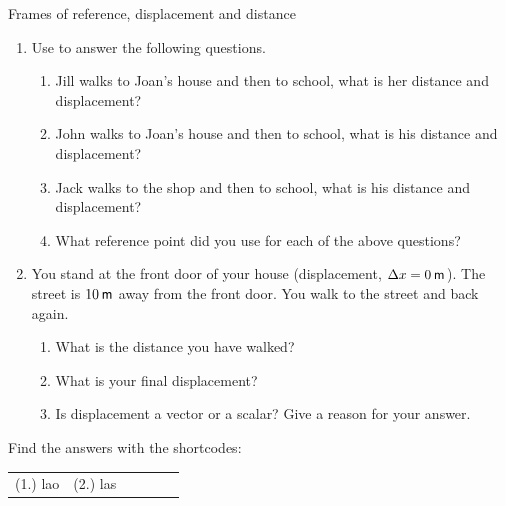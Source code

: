 \begin{exercises}{Frames of reference, displacement and distance}
            \nopagebreak
        \label{m38788*id64042}\begin{enumerate}[noitemsep, label=\textbf{\arabic*}. ] 
            \label{m38788*uid20}\item Use  to answer the following questions.
\label{m38788*id64060}\begin{enumerate}[noitemsep, label=\textbf{\alph*}. ] 
            \label{m38788*uid21}\item Jill walks to Joan's house and then to school, what is her distance and displacement?
\label{m38788*uid22}\item John walks to Joan's house and then to school, what is his distance and displacement?
\label{m38788*uid23}\item Jack walks to the shop and then to school, what is his distance and displacement?
\label{m38788*uid24}\item What reference point did you use for each of the above questions?
\end{enumerate}
                \label{m38788*uid25}\item You stand at the front door of your house (displacement, $\Delta x=0\phantom{\rule{2pt}{0ex}}\mathsf{m}$). The street is $10\phantom{\rule{2pt}{0ex}}\mathsf{m}$ away from the front door. You walk to the street and back again.
\label{m38788*id64141}\begin{enumerate}[noitemsep, label=\textbf{\alph*}. ] 
            \label{m38788*uid26}\item What is the distance you have walked?
\label{m38788*uid27}\item What is your final displacement?
\label{m38788*uid28}\item Is displacement a vector or a scalar? Give a reason for your answer.
\end{enumerate}
                \end{enumerate}
  \label{m38788**end}
\par {} Find the answers with the shortcodes:
 \par \begin{tabular}[h]{cccccc}
 (1.) lao  &  (2.) las  & \end{tabular}
\end{exercises}
